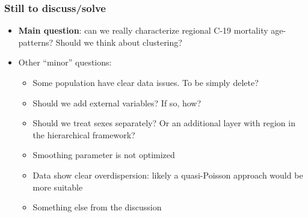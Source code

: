 \documentclass[table,xcdraw,dvipsnames]{beamer}
\begin{document}
\begin{frame}[fragile]
{\begin{center}
	\end{center}
	\vspace{-0.3cm}
}
\end{frame}

\begin{frame}[fragile]\frametitle{Still to discuss/solve}
	\begin{itemize}
		\item \textbf{Main question}: can we really characterize regional C-19 mortality age-patterns? Should we think about clustering?
		\bigskip
		\item Other ``minor'' questions:
		\begin{itemize}
		\item Some population have clear data issues. To be simply delete?
		\bigskip
		\item Should we add external variables? If so, how?
		\bigskip
		\item Should we treat sexes separately? Or an additional layer with region in the hierarchical framework?
		\bigskip
		\item Smoothing parameter is not optimized
		\bigskip
		\item Data show clear overdispersion: likely a quasi-Poisson approach would be more suitable
		\bigskip
		\item Something else from the discussion
	\end{itemize}
\end{itemize}
\end{frame}
\end{document}
